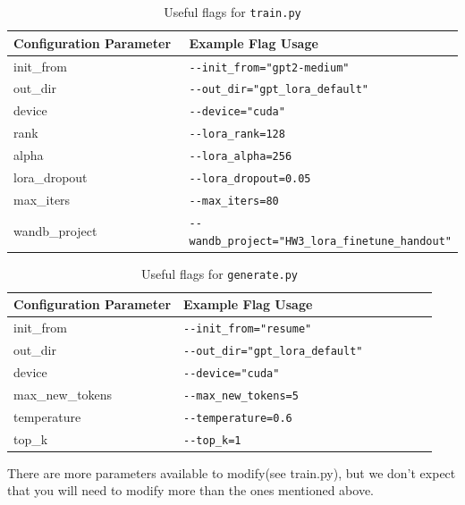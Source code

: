 \documentclass[11pt,addpoints,answers]{exam}
\begin{document}
\begin{questions}
\begin{table}[h!]
\centering
\begin{tabular}{|p{0.4\linewidth}|p{0.6\linewidth}|}
\hline
Configuration Parameter & Example Flag Usage \\ \hline
init\_from &  \lstinline|--init_from="gpt2-medium"|  \\ \hline
out\_dir &  \lstinline|--out_dir="gpt_lora_default"| \\ \hline
device & \lstinline|--device="cuda"| \\ \hline
rank &  \lstinline|--lora_rank=128|  \\ \hline
alpha &  \lstinline|--lora_alpha=256|  \\ \hline
lora\_dropout & \lstinline|--lora_dropout=0.05| \\ \hline
max\_iters &  \lstinline|--max_iters=80| \\ \hline
wandb\_project &  \lstinline|--wandb_project="HW3_lora_finetune_handout"| \\ \hline
\end{tabular}
\caption{Useful flags for \lstinline{train.py}}
\label{table:flag1}
\end{table}

\begin{table}[h!]
\centering
\begin{tabular}{|p{0.4\linewidth}|p{0.6\linewidth}|}
\hline
Configuration Parameter & Example Flag Usage \\ \hline
init\_from & \lstinline|--init_from="resume"| \\ \hline
out\_dir &  \lstinline|--out_dir="gpt_lora_default"| \\ \hline
device & \lstinline|--device="cuda"| \\ \hline
max\_new\_tokens & \lstinline|--max_new_tokens=5| \\ \hline
temperature & \lstinline|--temperature=0.6| \\ \hline
top\_k & \lstinline|--top_k=1| \\ \hline
\end{tabular}
\caption{Useful flags for \lstinline{generate.py}}
\label{table:flag2}
\end{table}


There are more parameters available to modify(see train.py), but we don't expect that you will need to modify more than the ones mentioned above.


\end{questions}
\end{document}
